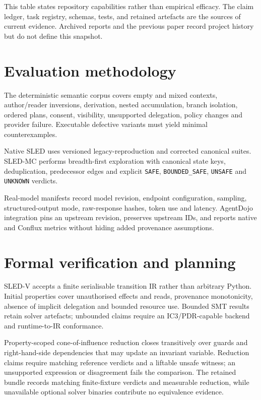\documentclass[11pt]{article}
\begin{document}
This table states repository capabilities rather than empirical efficacy. The
claim ledger, task registry, schemas, tests, and retained artefacts are the
sources of current evidence. Archived reports and the previous paper record
project history but do not define this snapshot.

\section{Evaluation methodology}
The deterministic semantic corpus covers empty and mixed contexts,
author/reader inversions, derivation, nested accumulation, branch isolation,
ordered plans, consent, visibility, unsupported delegation, policy changes and
provider failure. Executable defective variants must yield minimal
counterexamples.

Native SLED uses versioned legacy-reproduction and corrected canonical suites.
SLED-MC performs breadth-first exploration with canonical state keys,
deduplication, predecessor edges and explicit \texttt{SAFE},
\texttt{BOUNDED\_SAFE}, \texttt{UNSAFE} and \texttt{UNKNOWN} verdicts.

Real-model manifests record model revision, endpoint configuration, sampling,
structured-output mode, raw-response hashes, token use and latency. AgentDojo
integration pins an upstream revision, preserves upstream IDs, and reports
native and Conflux metrics without hiding added provenance assumptions.

\section{Formal verification and planning}
SLED-V accepts a finite serialisable transition IR rather than arbitrary
Python. Initial properties cover unauthorised effects and reads, provenance
monotonicity, absence of implicit delegation and bounded resource use. Bounded
SMT results retain solver artefacts; unbounded claims require an
IC3/PDR-capable backend and runtime-to-IR conformance.

Property-scoped cone-of-influence reduction closes transitively over guards and
right-hand-side dependencies that may update an invariant variable. Reduction
claims require matching reference verdicts and a liftable unsafe witness; an
unsupported expression or disagreement fails the comparison. The retained
bundle records matching finite-fixture verdicts and measurable reduction, while
unavailable optional solver binaries contribute no equivalence evidence.
\end{document}
